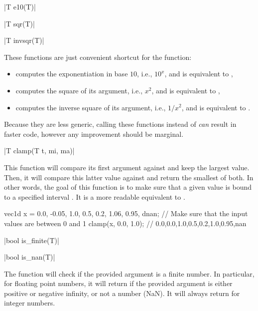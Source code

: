 \funcitem \vectorfunc \cppinline|T e10(T)| 

\vectorfunc \cppinline|T sqr(T)| 

\vectorfunc \cppinline|T invsqr(T)| 

These functions are just convenient shortcut for the  function:
\begin{itemize}
\item {} computes the exponentiation in base $10$, i.e., $10^x$, and is equivalent to ,
\item {} computes the square of its argument, i.e., $x^2$, and is equivalent to ,
\item {} computes the inverse square of its argument, i.e., $1/x^2$, and is equivalent to .
\end{itemize}

Because they are less generic, calling these functions instead of  \emph{can} result in faster code, however any improvement should be marginal.

\funcitem \vectorfunc \cppinline|T clamp(T t, mi, ma)| 

This function will compare its first argument against  and keep the largest value. Then, it will compare this latter value against  and return the smallest of both. In other words, the goal of this function is to make sure that a given value  is bound to a specified interval \cppinline{[mi, ma]}. It is a more readable equivalent to .

\begin{example}
\begin{cppcode}
vec1d x = {0.0, -0.05, 1.0, 0.5, 0.2, 1.06, 0.95, dnan};
// Make sure that the input values are between 0 and 1
clamp(x, 0.0, 1.0); // {0.0,0.0,1.0,0.5,0.2,1.0,0.95,nan}
\end{cppcode}
\end{example}

\funcitem \vectorfunc \cppinline|bool is_finite(T)| 

\vectorfunc \cppinline|bool is_nan(T)| 

The  function will check if the provided argument is a finite number. In particular, for floating point numbers, it will return  if the provided argument is either positive or negative infinity, or not a number (NaN). It will always return  for integer numbers.

